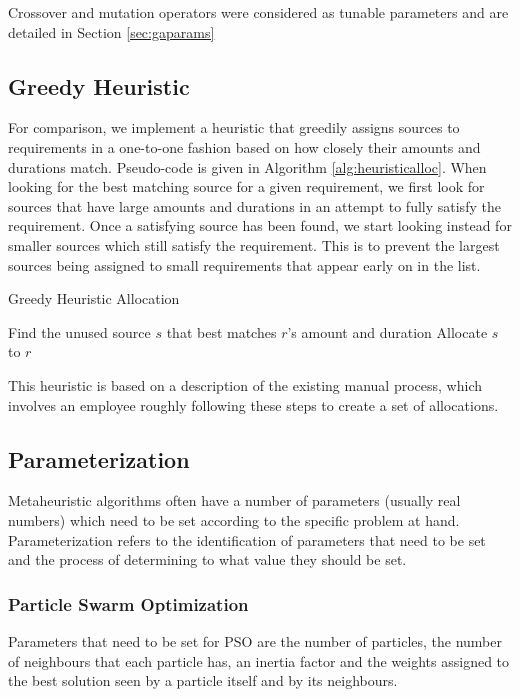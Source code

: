 \documentclass{sig-alternate}
\begin{document}
Crossover and mutation operators were considered as tunable parameters and are detailed in Section \ref{sec:gaparams}

\subsection{Greedy Heuristic}
For comparison, we implement a heuristic that greedily assigns sources to requirements in a one-to-one fashion based on how closely their amounts and durations match. Pseudo-code is given in Algorithm \ref{alg:heuristicalloc}. When looking for the best matching source for a given requirement, we first look for sources that have large amounts and durations in an attempt to fully satisfy the requirement. Once a satisfying source has been found, we start looking instead for smaller sources which still satisfy the requirement. This is to prevent the largest sources being assigned to small requirements that appear early on in the list.

\begin{algorithm}
\caption{Greedy Heuristic Allocation} \label{alg:heuristicalloc}
\begin{algorithmic}[1]
		\State Find the unused source $s$ that best matches $r$'s amount and duration
		\State Allocate $s$ to $r$
	\EndFor
\end{algorithmic}
\end{algorithm}

This heuristic is based on a description of the existing manual process, which involves an employee roughly following these steps to create a set of allocations.

\subsection{Parameterization}
Metaheuristic algorithms often have a number of parameters (usually real numbers) which need to be set according to the specific problem at hand. Parameterization refers to the identification of parameters that need to be set and the process of determining to what value they should be set.

\subsubsection{Particle Swarm Optimization}
Parameters that need to be set for PSO are the number of particles, the number of neighbours that each particle has, an inertia factor and the weights assigned to the best solution seen by a particle itself and by its neighbours.
\end{document}
